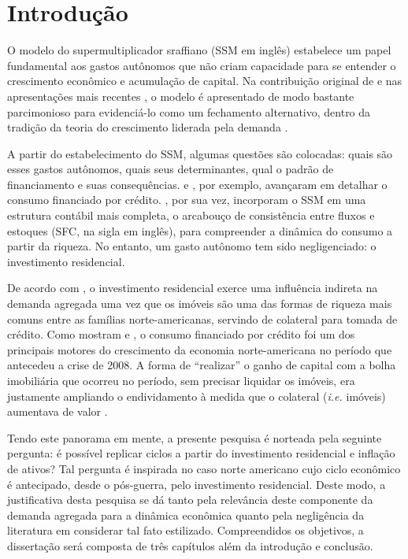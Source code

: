 \chapter{Introdução}

O modelo do supermultiplicador sraffiano (SSM em inglês) estabelece um papel fundamental aos gastos autônomos que não criam capacidade para se entender o crescimento econômico e acumulação de capital. Na contribuição original de \textcite{serrano_sraffian_1995} e nas apresentações mais recentes \cite{freitas_growth_2015}, o modelo é apresentado de modo bastante parcimonioso para evidenciá-lo como um fechamento alternativo, dentro da tradição da teoria do crescimento liderada pela demanda \cite{serrano_sraffian_2017}. 

A partir do estabelecimento do SSM, algumas questões são colocadas: quais são esses gastos autônomos, quais seus determinantes, qual o padrão de financiamento e suas consequências. \textcite{pariboni_household_2016} e \textcite{fagundes_role_2017}, por exemplo, avançaram em detalhar o consumo financiado por crédito.  \textcite{brochier_supermultiplier_2018}, por sua vez, incorporam o SSM em uma estrutura contábil mais completa, o arcabouço de consistência entre fluxos e estoques (SFC, na sigla em inglês), para compreender a dinâmica do consumo a partir da riqueza. No entanto, um gasto autônomo tem sido negligenciado: o investimento residencial. 

De acordo com \textcite{teixeira_uma_2011}, o investimento residencial exerce uma influência indireta na demanda agregada uma vez que os imóveis são uma das formas de riqueza mais comuns entre as famílias norte-americanas, servindo de colateral para tomada de crédito. Como mostram \textcite{zezza_u.s._2008} e \textcite{barba_rising_2009}, o consumo financiado por crédito foi um dos principais motores do crescimento da economia norte-americana no período que antecedeu a crise de 2008. A forma de ``realizar'' o ganho de capital com a bolha imobiliária que ocorreu no período, sem precisar liquidar os imóveis, era justamente ampliando o endividamento à medida que o colateral (\textit{i.e.} imóveis) aumentava de valor \cite{teixeira_crescimento_2015}. 

Tendo este panorama em mente, a presente pesquisa é norteada pela seguinte pergunta: é possível replicar ciclos a partir do investimento residencial e inflação de ativos? Tal pergunta é inspirada no caso norte americano cujo ciclo econômico é antecipado, desde o pós-guerra, pelo investimento residencial. Deste modo, a justificativa desta pesquisa se dá tanto pela relevância deste componente da demanda agregada para a dinâmica econômica quanto pela negligência da literatura em considerar tal fato estilizado. Compreendidos os objetivos, a dissertação será composta de três capítulos além da introdução e conclusão.



